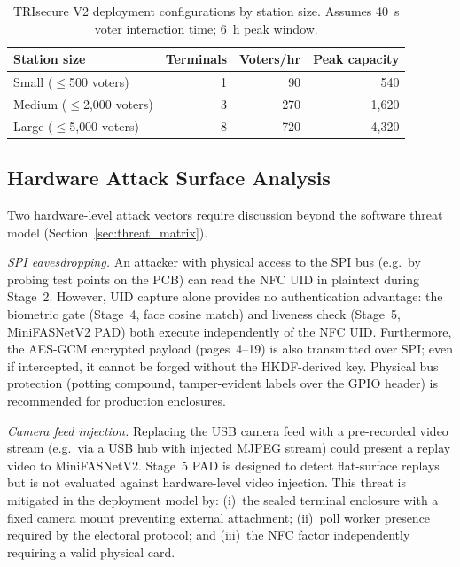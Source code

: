 \documentclass[conference]{IEEEtran}
\begin{document}
\begin{table}[t]
\centering
\caption{TRIsecure V2 deployment configurations by station size.
  Assumes 40~s voter interaction time; 6~h peak window.}
\label{tab:throughput_scenarios}
\begin{tabular}{lrrr}
  \toprule
  Station size & Terminals & Voters/hr & Peak capacity \\
  \midrule
  Small  ($\leq$500 voters)   & 1 & 90  & 540  \\
  Medium ($\leq$2{,}000 voters) & 3 & 270 & 1{,}620 \\
  Large  ($\leq$5{,}000 voters) & 8 & 720 & 4{,}320 \\
  \bottomrule
\end{tabular}
\end{table}

\subsection{Hardware Attack Surface Analysis}
\label{sec:hw_attack}

Two hardware-level attack vectors require discussion beyond the software
threat model (Section~\ref{sec:threat_matrix}).

\textit{SPI eavesdropping.} An attacker with physical access to the SPI bus
(e.g.\ by probing test points on the PCB) can read the NFC UID in plaintext
during Stage~2. However, UID capture alone provides no authentication
advantage: the biometric gate (Stage~4, face cosine match) and liveness
check (Stage~5, MiniFASNetV2 PAD) both execute independently of the NFC UID.
Furthermore, the AES-GCM encrypted payload (pages~4–19) is also transmitted
over SPI; even if intercepted, it cannot be forged without the HKDF-derived
key. Physical bus protection (potting compound, tamper-evident labels over
the GPIO header) is recommended for production enclosures.

\textit{Camera feed injection.} Replacing the USB camera feed with a
pre-recorded video stream (e.g.\ via a USB hub with injected MJPEG stream)
could present a replay video to MiniFASNetV2. Stage~5 PAD is designed to
detect flat-surface replays but is not evaluated against hardware-level
video injection. This threat is mitigated in the deployment model by: (i)~the
sealed terminal enclosure with a fixed camera mount preventing external
attachment; (ii)~poll worker presence required by the electoral protocol; and
(iii)~the NFC factor independently requiring a valid physical card.
\end{document}
